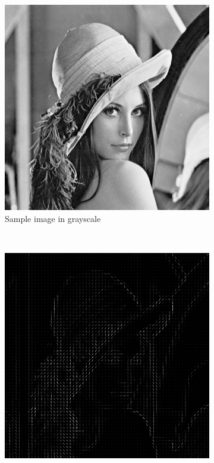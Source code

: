 \begin{figure}[h]
    \begin{subfigure}[t]{0.3\textwidth}
        \includegraphics[width=\textwidth]{images/lena}
        \caption{Sample image in grayscale}
    \end{subfigure}
    ~
    \begin{subfigure}[t]{0.3\textwidth}
        \includegraphics[width=\textwidth]{images/lena_hog_8x8}

\end{subfigure}
\end{figure}
